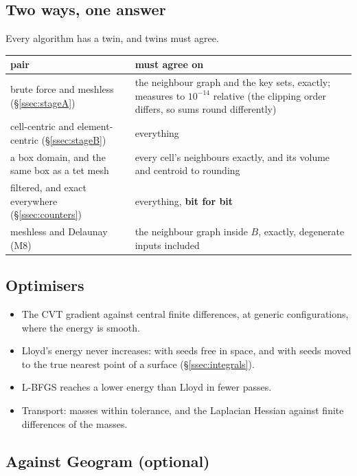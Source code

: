 \documentclass[11pt,a4paper]{article}
\newcommand{\secref}[1]{\S\ref{#1}}
\begin{document}
\subsection{Two ways, one answer}\label{ssec:twins}

Every algorithm has a twin, and twins must agree.

{\small
\begin{xltabular}{\linewidth}{@{}P{5.6cm} L@{}}
\toprule
pair & must agree on \\
\midrule
\endhead
brute force and meshless (\secref{ssec:stageA})
  & the neighbour graph and the key sets, exactly; measures to $10^{-14}$ relative (the clipping
    order differs, so sums round differently) \\
cell-centric and element-centric (\secref{ssec:stageB}) & everything \\
a box domain, and the same box as a tet mesh
  & every cell's neighbours exactly, and its volume and centroid to rounding \\
filtered, and exact everywhere (\secref{ssec:counters}) & everything, \textbf{bit for bit} \\
meshless and Delaunay (M8)
  & the neighbour graph inside $B$, exactly, degenerate inputs included \\
\bottomrule
\end{xltabular}}

\subsection{Optimisers}\label{ssec:opttests}

\begin{itemize}
\item The CVT gradient against central finite differences, at generic configurations, where the
  energy is smooth.
\item Lloyd's energy never increases: with seeds free in space, and with seeds moved to the true
  nearest point of a surface (\secref{ssec:integrals}).
\item L-BFGS reaches a lower energy than Lloyd in fewer passes.
\item Transport: masses within tolerance, and the Laplacian Hessian against finite differences of
  the masses.
\end{itemize}

\subsection{Against Geogram (optional)}\label{ssec:geogram}
\end{document}
